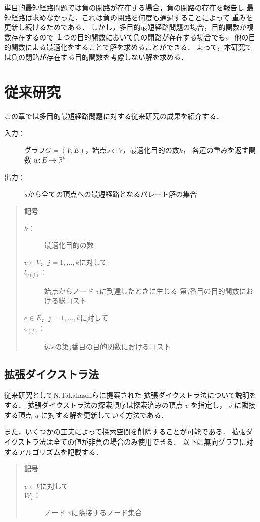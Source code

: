 \documentclass[12pt]{optlab-bachelor}
\begin{document}
単目的最短経路問題では負の閉路が存在する場合，負の閉路の存在を報告し
最短経路は求めなかった．これは負の閉路を何度も通過することによって
重みを更新し続けるためである．
しかし，多目的最短経路問題の場合，目的関数が複数存在するので
１つの目的関数において負の閉路が存在する場合でも，
他の目的関数による最適化をすることで解を求めることができる．
よって，本研究では負の閉路が存在する目的関数を考慮しない解を求める．


\chapter{従来研究}
この章では多目的最短経路問題に対する従来研究の成果を紹介する．
\begin{description}
  \item[入力：] グラフ$G=(V,E)$，始点$s \in V$，最適化目的の数$k$，
  各辺の重みを返す関数 $w : E \to \mathbb{R}^k$
  \item[出力：] $s$から全ての頂点への最短経路となるパレート解の集合
\end{description}
\begin{quote}
  \textbf{記号}
  \begin{description}
    \item[$k$：] 最適化目的の数
    \item[$v \in V$，$j = 1 , \ldots , k$に対して]
    \item[$l_{v(j)}$：] 始点からノード $v$に到達したときに生じる
    第$j$番目の目的関数における総コスト
    \item[$e \in E$，$j = 1 , \ldots , k$に対して]
    \item[$e_{(j)}$：] 辺$e$の第$j$番目の目的関数におけるコスト
  \end{description}
\end{quote}



\section{拡張ダイクストラ法}
従来研究としてN.Takahashiら\cite{N.TAKAHASHI1}に提案された
拡張ダイクストラ法について説明をする．
拡張ダイクストラ法の探索順序は探索済みの頂点 $v$ を指定し，
$v$ に隣接する頂点 $u$ に対する解を更新していく方法である．

また，いくつかの工夫によって探索空間を削除することが可能である．
拡張ダイクストラ法は全ての値が非負の場合のみ使用できる．
以下に無向グラフに対するアルゴリズムを記載する．

\begin{quote}
  \textbf{記号}
  \begin{description}
    \item[$v \in V$に対して]
    \item[$W_v$：] ノード $v$に隣接するノード集合
  \end{description}
\end{quote}
\end{document}
